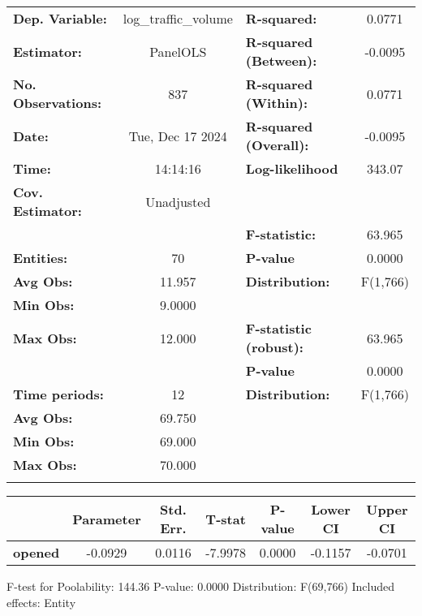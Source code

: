 \begin{center}
\begin{tabular}{lclc}
\toprule
\textbf{Dep. Variable:}    & log\_traffic\_volume & \textbf{  R-squared:         }   &      0.0771      \\
\textbf{Estimator:}        &       PanelOLS       & \textbf{  R-squared (Between):}  &     -0.0095      \\
\textbf{No. Observations:} &         837          & \textbf{  R-squared (Within):}   &      0.0771      \\
\textbf{Date:}             &   Tue, Dec 17 2024   & \textbf{  R-squared (Overall):}  &     -0.0095      \\
\textbf{Time:}             &       14:14:16       & \textbf{  Log-likelihood     }   &      343.07      \\
\textbf{Cov. Estimator:}   &      Unadjusted      & \textbf{                     }   &                  \\
\textbf{}                  &                      & \textbf{  F-statistic:       }   &      63.965      \\
\textbf{Entities:}         &          70          & \textbf{  P-value            }   &      0.0000      \\
\textbf{Avg Obs:}          &        11.957        & \textbf{  Distribution:      }   &     F(1,766)     \\
\textbf{Min Obs:}          &        9.0000        & \textbf{                     }   &                  \\
\textbf{Max Obs:}          &        12.000        & \textbf{  F-statistic (robust):} &      63.965      \\
\textbf{}                  &                      & \textbf{  P-value            }   &      0.0000      \\
\textbf{Time periods:}     &          12          & \textbf{  Distribution:      }   &     F(1,766)     \\
\textbf{Avg Obs:}          &        69.750        & \textbf{                     }   &                  \\
\textbf{Min Obs:}          &        69.000        & \textbf{                     }   &                  \\
\textbf{Max Obs:}          &        70.000        & \textbf{                     }   &                  \\
\textbf{}                  &                      & \textbf{                     }   &                  \\
\bottomrule
\end{tabular}
\begin{tabular}{lcccccc}
                & \textbf{Parameter} & \textbf{Std. Err.} & \textbf{T-stat} & \textbf{P-value} & \textbf{Lower CI} & \textbf{Upper CI}  \\
\midrule
\textbf{opened} &      -0.0929       &       0.0116       &     -7.9978     &      0.0000      &      -0.1157      &      -0.0701       \\
\bottomrule
\end{tabular}
\end{center}

F-test for Poolability: 144.36 \newline
 P-value: 0.0000 \newline
 Distribution: F(69,766) \newline
  \newline
 Included effects: Entity